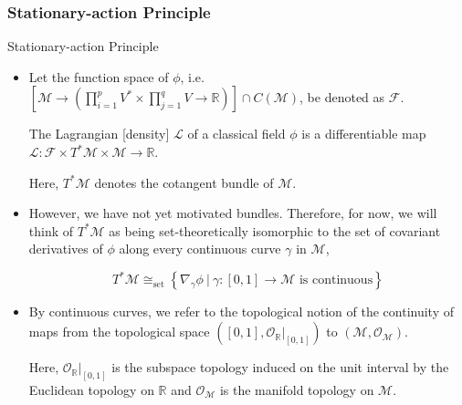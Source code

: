 \documentclass[9pt,handout]{beamer}
\begin{document}
\subsubsection{Stationary-action Principle}
\begin{frame}{Stationary-action Principle}
\begin{itemize}
\item Let the function space of $\phi$, i.e. $\displaystyle{\left[ \mathcal{M} \to \left( \prod_{i=1}^{p} V^* \times \prod_{j=1}^q V \to \mathbb{R} \right) \right] \cap C \left( \mathcal{M} \right)}$, be denoted as $\mathcal{F}$.

\begin{definition}[Lagrangian]
The Lagrangian [density] $\mathcal{L}$ of a classical field $\phi$ is a differentiable map $\mathcal{L} : \mathcal{F} \times T^* \mathcal{M} \times \mathcal{M} \to \mathbb{R}$.
\end{definition}

Here, $T^* \mathcal{M}$ denotes the cotangent bundle of $\mathcal{M}$.

\item However, we have not yet motivated bundles. Therefore, for now, we will think of $T^* \mathcal{M}$ as being set-theoretically isomorphic to the set of covariant derivatives of $\phi$ along every continuous curve $\gamma$ in $\mathcal{M}$,

$$T^* \mathcal{M} \cong_{\text{set}} \left\{ \nabla_\gamma \phi \: \vert \: \gamma : \left[ 0, 1 \right] \to \mathcal{M} \text{ is continuous} \right\}$$

\item By continuous curves, we refer to the topological notion of the continuity of maps from the topological space $\left( \left[ 0, 1 \right], \mathcal{O}_{\mathbb{R}} \big\vert_{\left[ 0, 1 \right]} \right)$ to $\left( \mathcal{M}, \mathcal{O}_{\mathcal{M}} \right)$.

Here, $\mathcal{O}_{\mathbb{R}} \big\vert_{\left[ 0, 1 \right]}$ is the subspace topology induced on the unit interval by the Euclidean topology on $\mathbb{R}$ and $\mathcal{O}_{\mathcal{M}}$ is the manifold topology on $\mathcal{M}$.

\end{itemize}
\end{frame}
\end{document}
